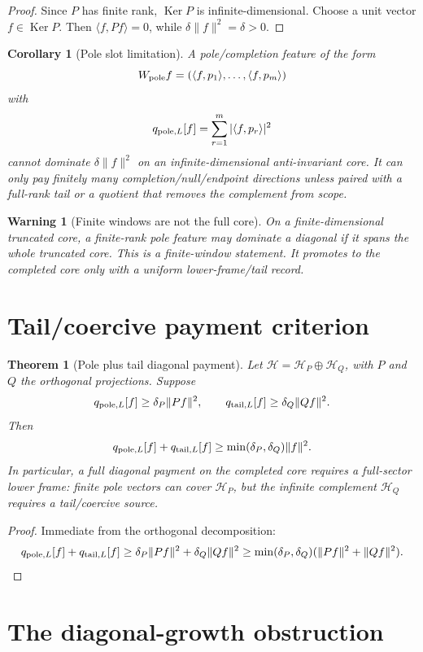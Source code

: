\documentclass[11pt]{article}
\newtheorem{theorem}{Theorem}
\newtheorem{corollary}{Corollary}
\newtheorem{warning}{Warning}
\newcommand{\Hc}{\mathcal H}
\newcommand{\qtail}{q_{{\rm tail},L}}
\newcommand{\qpole}{q_{{\rm pole},L}}
\newcommand{\Ker}{\operatorname{Ker}}
\begin{document}
\begin{proof}
Since \(P\) has finite rank, \(\Ker P\) is infinite-dimensional.  Choose a unit vector \(f\in\Ker P\). Then \(\langle f,Pf\rangle=0\), while \(\delta\|f\|^2=\delta>0\).
\end{proof}

\begin{corollary}[Pole slot limitation]
A pole/completion feature of the form
\[
W_{{\rm pole}}f=(\langle f,p_1\rangle,\ldots,\langle f,p_m\rangle)
\]
with
\[
\qpole[f]=\sum_{r=1}^m |\langle f,p_r\rangle|^2
\]
cannot dominate \(\delta\|f\|^2\) on an infinite-dimensional anti-invariant core.  It can only pay finitely many completion/null/endpoint directions unless paired with a full-rank tail or a quotient that removes the complement from scope.
\end{corollary}

\begin{warning}[Finite windows are not the full core]
On a finite-dimensional truncated core, a finite-rank pole feature may dominate a diagonal if it spans the whole truncated core.  This is a finite-window statement.  It promotes to the completed core only with a uniform lower-frame/tail record.
\end{warning}

\section{Tail/coercive payment criterion}

\begin{theorem}[Pole plus tail diagonal payment]
Let \(\Hc=\Hc_P\oplus\Hc_Q\), with \(P\) and \(Q\) the orthogonal projections. Suppose
\[
\qpole[f]\ge \delta_P\|Pf\|^2,
\qquad
\qtail[f]\ge \delta_Q\|Qf\|^2.
\]
Then
\[
\qpole[f]+\qtail[f]
\ge \min(\delta_P,\delta_Q)\|f\|^2.
\]
In particular, a full diagonal payment on the completed core requires a full-sector lower frame: finite pole vectors can cover \(\Hc_P\), but the infinite complement \(\Hc_Q\) requires a tail/coercive source.
\end{theorem}

\begin{proof}
Immediate from the orthogonal decomposition:
\[
\qpole[f]+\qtail[f]\ge \delta_P\|Pf\|^2+\delta_Q\|Qf\|^2
\ge \min(\delta_P,\delta_Q)(\|Pf\|^2+\|Qf\|^2).
\]
\end{proof}

\section{The diagonal-growth obstruction}
\end{document}
